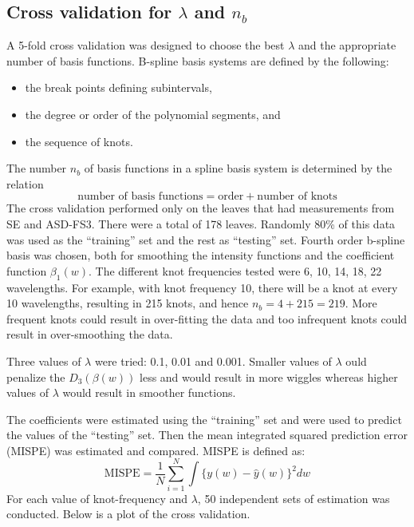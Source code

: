 \subsection*{Cross validation for $\lambda$ and $n_b$}
A 5-fold cross validation was designed to choose the best $\lambda$ and the appropriate number of basis functions. B-spline basis systems are defined by the following:
\begin{itemize}
\item the break points defining subintervals,
\item the degree or order of the polynomial segments, and
\item the sequence of knots.
\end{itemize}
The number $n_b$ of basis functions in a spline basis system is determined by the relation
\[ \text{number of basis functions} = \text{order} + \text{number of knots} \]
The cross validation performed only on the leaves that had measurements from SE and ASD-FS3. There were a total of 178 leaves. Randomly 80\% of this data was used as the ``training'' set and the rest as ``testing'' set. Fourth order b-spline basis was chosen, both for smoothing the intensity functions and the coefficient function $\beta_1(w)$. The different knot frequencies tested were 6, 10, 14, 18, 22 wavelengths. For example, with knot frequency 10, there will be a knot at every 10 wavelengths, resulting in 215 knots, and hence $n_b = 4 + 215 = 219$. More frequent knots could result in over-fitting the data and too infrequent knots could result in over-smoothing the data.

Three values of $\lambda$ were tried: 0.1, 0.01 and 0.001. Smaller values of $\lambda$ ould penalize the $D_3(\beta(w))$ less and would result in more wiggles whereas higher values of $\lambda$ would result in smoother functions.

The coefficients were estimated using the ``training'' set and were used to predict the values of the ``testing'' set. Then the mean integrated squared prediction error (MISPE) was estimated and compared. MISPE is defined as:
\begin{equation}
\text{MISPE} = \frac{1}{N} \sum \limits_{i = 1} ^{N} \int \{y(w) - \hat{y}(w)\}^2dw
\end{equation}
For each value of knot-frequency and $\lambda$, 50 independent sets of estimation was conducted. Below is a plot of the cross validation.


